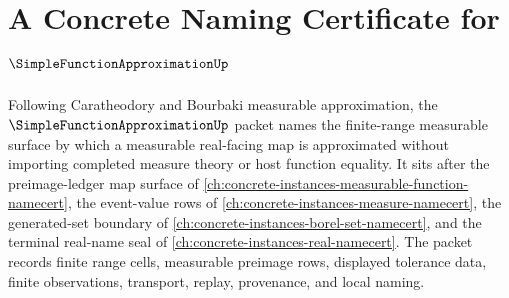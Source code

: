 \chapter{A Concrete Naming Certificate for $\SimpleFunctionApproximationUp$}
\label{ch:concrete-instances-simple-function-approximation-namecert}

Following Caratheodory and Bourbaki measurable approximation, the $\SimpleFunctionApproximationUp$ packet names the finite-range measurable surface by which a measurable real-facing map is approximated without importing completed measure theory or host function equality. It sits after the preimage-ledger map surface of \autoref{ch:concrete-instances-measurable-function-namecert}, the event-value rows of \autoref{ch:concrete-instances-measure-namecert}, the generated-set boundary of \autoref{ch:concrete-instances-borel-set-namecert}, and the terminal real-name seal of \autoref{ch:concrete-instances-real-namecert}. The packet records finite range cells, measurable preimage rows, displayed tolerance data, finite observations, transport, replay, provenance, and local naming.

